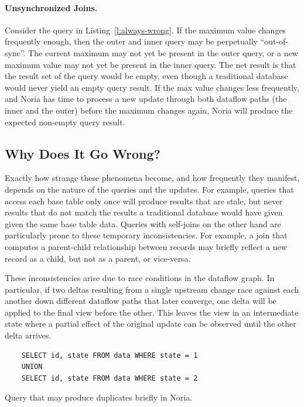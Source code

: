 \paragraph{Unsynchronized Joins.}
Consider the query in Listing~\vref{l:always-wrong}. If the maximum value
changes frequently enough, then the outer and inner query may be perpetually
``out-of-sync''. The current maximum may not yet be present in the outer query,
or a new maximum value may not yet be present in the inner query. The net result
is that the result set of the query would be empty, even though a traditional
database would never yield an empty query result. If the max value changes less
frequently, and Noria has time to process a new update through both dataflow
paths (the inner and the outer) before the maximum changes again, Noria will
produce the expected non-empty query result.

\subsection{Why Does It Go Wrong?}

Exactly how strange these phenomena become, and how frequently they manifest,
depends on the nature of the queries and the updates. For example, queries that
access each base table only once will produce results that are stale, but never
results that do not match the results a traditional database would have given
given the same base table data. Queries with self-joins on the other hand are
particularly prone to these temporary inconsistencies. For example, a join that
computes a parent-child relationship between records may briefly reflect a new
record as a child, but not as a parent, or vice-versa.

These inconsistencies arise due to race conditions in the dataflow graph. In
particular, if two deltas resulting from a single upstream change race against
each another down different dataflow paths that later converge, one delta will
be applied to the final view before the other. This leaves the view in an
intermediate state where a partial effect of the original update can be observed
until the other delta arrives.

\begin{listing}[h]
  \begin{verbatim}
    SELECT id, state FROM data WHERE state = 1
    UNION
    SELECT id, state FROM data WHERE state = 2
  \end{verbatim}
  \caption{Query that may produce duplicates briefly in Noria.}
  \label{l:duplicates}
\end{listing}

